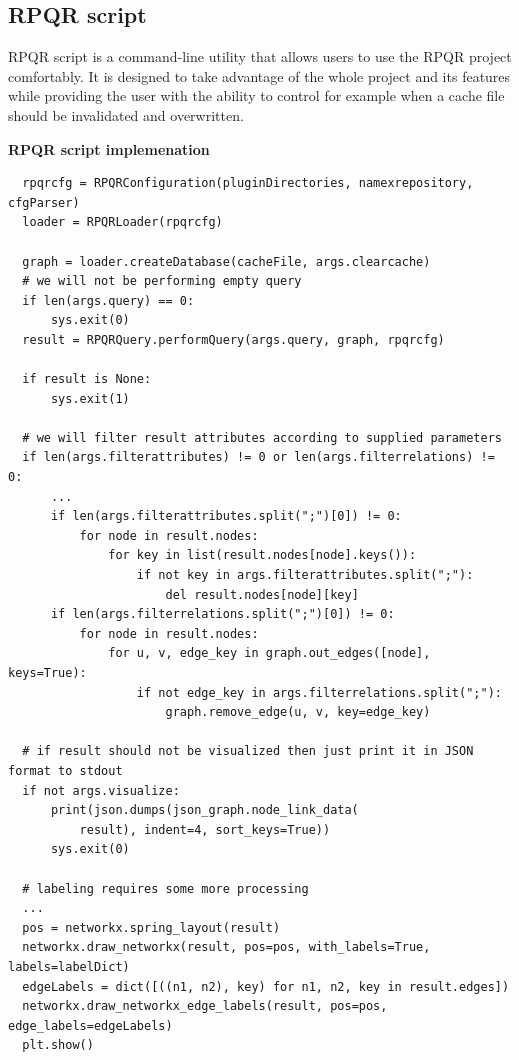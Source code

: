 \newpage

\subsection*{RPQR script}
RPQR script is a command-line utility that allows users to use the RPQR project comfortably. It is designed
to take advantage of the whole project and its features while providing the user with the ability to
control for example when a cache file should be invalidated and overwritten.

\textbf{RPQR script implemenation}

\begin{lstlisting}
  rpqrcfg = RPQRConfiguration(pluginDirectories, namexrepository, cfgParser)
  loader = RPQRLoader(rpqrcfg)

  graph = loader.createDatabase(cacheFile, args.clearcache)
  # we will not be performing empty query
  if len(args.query) == 0:
      sys.exit(0)
  result = RPQRQuery.performQuery(args.query, graph, rpqrcfg)

  if result is None:
      sys.exit(1)

  # we will filter result attributes according to supplied parameters
  if len(args.filterattributes) != 0 or len(args.filterrelations) != 0:
      ...
      if len(args.filterattributes.split(";")[0]) != 0:
          for node in result.nodes:
              for key in list(result.nodes[node].keys()):
                  if not key in args.filterattributes.split(";"):
                      del result.nodes[node][key]
      if len(args.filterrelations.split(";")[0]) != 0:
          for node in result.nodes:
              for u, v, edge_key in graph.out_edges([node], keys=True):
                  if not edge_key in args.filterrelations.split(";"):
                      graph.remove_edge(u, v, key=edge_key)

  # if result should not be visualized then just print it in JSON format to stdout
  if not args.visualize:
      print(json.dumps(json_graph.node_link_data(
          result), indent=4, sort_keys=True))
      sys.exit(0)

  # labeling requires some more processing
  ...
  pos = networkx.spring_layout(result)
  networkx.draw_networkx(result, pos=pos, with_labels=True, labels=labelDict)
  edgeLabels = dict([((n1, n2), key) for n1, n2, key in result.edges])
  networkx.draw_networkx_edge_labels(result, pos=pos, edge_labels=edgeLabels)
  plt.show()
\end{lstlisting}

